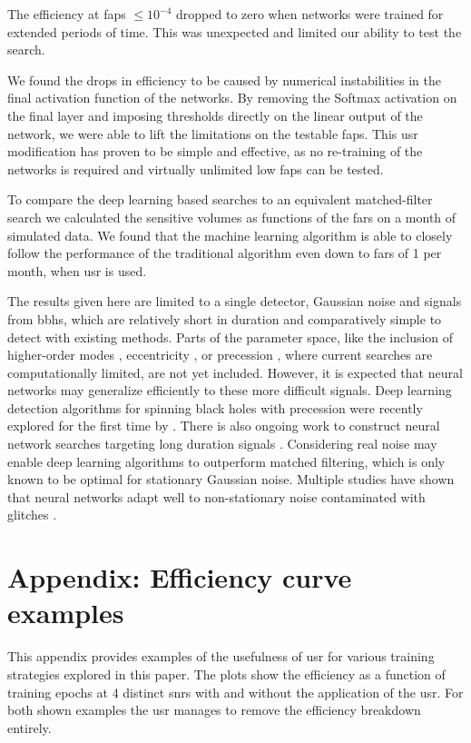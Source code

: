 The efficiency at \acrshort{fap}s $\leq 10^{-4}$ dropped to zero when networks were trained for extended periods of time. This was unexpected and limited our ability to test the search.

We found the drops in efficiency to be caused by numerical instabilities in the final activation function of the networks. By removing the Softmax activation on the final layer and imposing thresholds directly on the linear output of the network, we were able to lift the limitations on the testable \acrshort{fap}s. This \acrshort{usr} modification has proven to be simple and effective, as no re-training of the networks is required and virtually unlimited low \acrshort{fap}s can be tested.

To compare the deep learning based searches to an equivalent matched-filter search we calculated the sensitive volumes as functions of the \acrshort{far}s on a month of simulated data. We found that the machine learning algorithm is able to closely follow the performance of the traditional algorithm even down to \acrshort{far}s of 1 per month, when \acrshort{usr} is used.

The results given here are limited to a single detector, Gaussian noise and signals from \acrshort{bbh}s, which are relatively short in duration and comparatively simple to detect with existing methods. Parts of the parameter space, like the inclusion of higher-order modes \cite{Harry:2017weg}, eccentricity \cite{Nitz:2019spj}, or precession \cite{Harry:2016ijz}, where current searches are computationally limited, are not yet included. However, it is expected that neural networks may generalize efficiently to these more difficult signals. Deep learning detection algorithms for spinning black holes with precession were recently explored for the first time by \cite{Wei:2020ztw}. There is also ongoing work to construct neural network searches targeting long duration signals \cite{Dreissigacker:2020xfr, Krastev:2019koe, Schafer:2020kor, Wei:2020sfz}. Considering real noise may enable deep learning algorithms to outperform matched filtering, which is only known to be optimal for stationary Gaussian noise. Multiple studies have shown that neural networks adapt well to non-stationary noise contaminated with glitches \cite{George:2017pmj,Wei:2020sfz,Wei:2020ztw,Yan:2021wml}.


\section{Appendix: Efficiency curve examples}
This appendix provides examples of the usefulness of \acrshort{usr} for various training strategies explored in this paper. The plots show the efficiency as a function of training epochs at 4 distinct \acrshort{snr}s with and without the application of the \acrshort{usr}. For both shown examples the \acrshort{usr} manages to remove the efficiency breakdown entirely.

